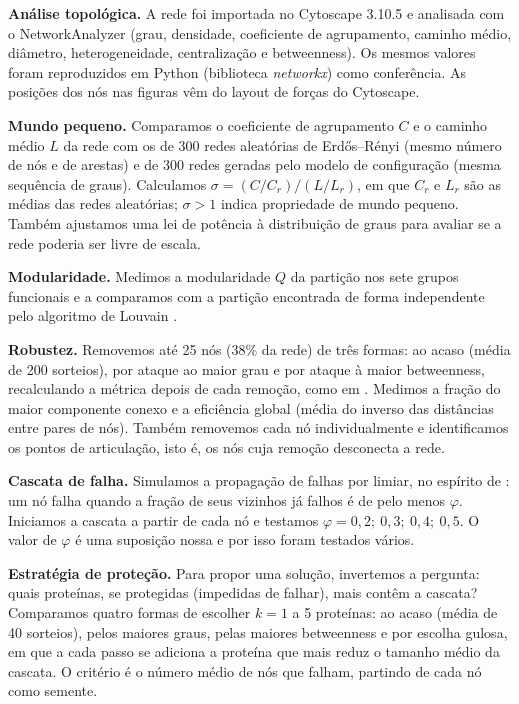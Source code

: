 \documentclass[12pt,a4paper]{article}
\begin{document}
\textbf{Análise topológica.} A rede foi importada no Cytoscape 3.10.5 \cite{shannon2003} e analisada com o NetworkAnalyzer (grau, densidade, coeficiente de agrupamento, caminho médio, diâmetro, heterogeneidade, centralização e betweenness). Os mesmos valores foram reproduzidos em Python (biblioteca \textit{networkx}) como conferência. As posições dos nós nas figuras vêm do layout de forças do Cytoscape.

\textbf{Mundo pequeno.} Comparamos o coeficiente de agrupamento $C$ e o caminho médio $L$ da rede com os de 300 redes aleatórias de Erdős--Rényi (mesmo número de nós e de arestas) e de 300 redes geradas pelo modelo de configuração (mesma sequência de graus). Calculamos $\sigma = (C/C_r)/(L/L_r)$, em que $C_r$ e $L_r$ são as médias das redes aleatórias; $\sigma > 1$ indica propriedade de mundo pequeno. Também ajustamos uma lei de potência à distribuição de graus para avaliar se a rede poderia ser livre de escala.

\textbf{Modularidade.} Medimos a modularidade $Q$ \cite{newman2006} da partição nos sete grupos funcionais e a comparamos com a partição encontrada de forma independente pelo algoritmo de Louvain \cite{blondel2008}.

\textbf{Robustez.} Removemos até 25 nós (38\% da rede) de três formas: ao acaso (média de 200 sorteios), por ataque ao maior grau e por ataque à maior betweenness, recalculando a métrica depois de cada remoção, como em \cite{albert2000}. Medimos a fração do maior componente conexo e a eficiência global (média do inverso das distâncias entre pares de nós). Também removemos cada nó individualmente e identificamos os pontos de articulação, isto é, os nós cuja remoção desconecta a rede.

\textbf{Cascata de falha.} Simulamos a propagação de falhas por limiar, no espírito de \cite{buldyrev2010}: um nó falha quando a fração de seus vizinhos já falhos é de pelo menos $\varphi$. Iniciamos a cascata a partir de cada nó e testamos $\varphi = 0{,}2;\ 0{,}3;\ 0{,}4;\ 0{,}5$. O valor de $\varphi$ é uma suposição nossa e por isso foram testados vários. 

\textbf{Estratégia de proteção.} Para propor uma solução, invertemos a pergunta: quais proteínas, se protegidas (impedidas de falhar), mais contêm a cascata? Comparamos quatro formas de escolher $k = 1$ a 5 proteínas: ao acaso (média de 40 sorteios), pelos maiores graus, pelas maiores betweenness e por escolha gulosa, em que a cada passo se adiciona a proteína que mais reduz o tamanho médio da cascata. O critério é o número médio de nós que falham, partindo de cada nó como semente.
\end{document}
